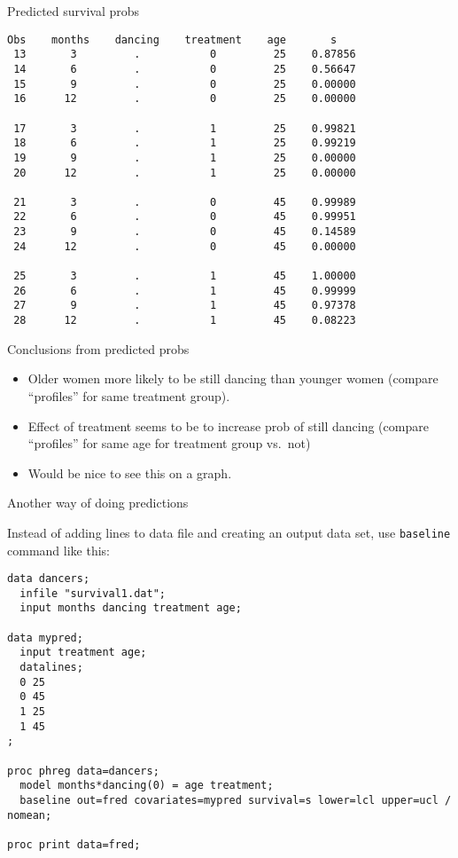 \documentclass[pdf]{prosper}
\begin{document}
\begin{slide}{Predicted survival probs}

{\scriptsize
\begin{verbatim}
Obs    months    dancing    treatment    age       s
 13       3         .           0         25    0.87856
 14       6         .           0         25    0.56647
 15       9         .           0         25    0.00000
 16      12         .           0         25    0.00000
 
 17       3         .           1         25    0.99821
 18       6         .           1         25    0.99219
 19       9         .           1         25    0.00000
 20      12         .           1         25    0.00000

 21       3         .           0         45    0.99989
 22       6         .           0         45    0.99951
 23       9         .           0         45    0.14589
 24      12         .           0         45    0.00000

 25       3         .           1         45    1.00000
 26       6         .           1         45    0.99999
 27       9         .           1         45    0.97378
 28      12         .           1         45    0.08223
\end{verbatim}
}
  
\end{slide}

\begin{slide}{Conclusions from predicted probs}

  \begin{itemize}
  \item Older women more likely to be still dancing than younger women
    (compare ``profiles'' for same treatment group).
  \item Effect of treatment seems to be to increase prob of still dancing (compare ``profiles'' for same age for treatment group vs.\ not)
  \item Would be nice to see this on a graph.
  \end{itemize}
  
\end{slide}



\begin{slide}{Another way of doing predictions}

Instead of adding lines to data file and creating an output data set, use \verb-baseline- command like this:

{\scriptsize
\begin{verbatim}
data dancers;
  infile "survival1.dat";
  input months dancing treatment age;

data mypred;
  input treatment age;
  datalines;
  0 25 
  0 45 
  1 25 
  1 45 
;

proc phreg data=dancers;
  model months*dancing(0) = age treatment;
  baseline out=fred covariates=mypred survival=s lower=lcl upper=ucl / 
nomean;
   
proc print data=fred;
\end{verbatim}
}  

\end{slide}
\end{document}
